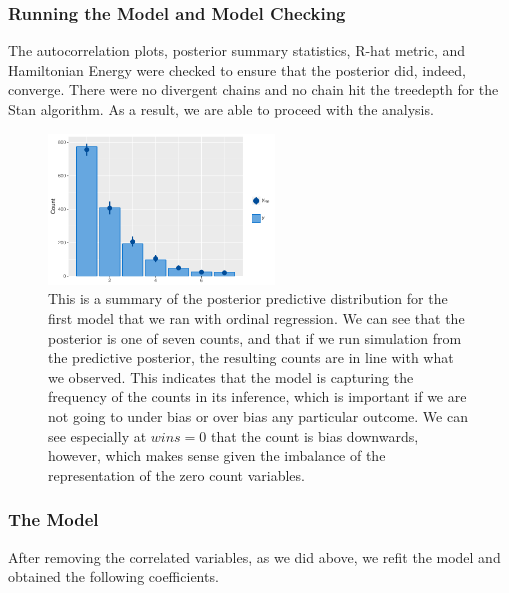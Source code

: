 \documentclass[10pt,a4paper, hidelinks]{article} %
\begin{document}
\subsubsection{Running the Model and Model Checking}

The autocorrelation plots, posterior summary statistics, R-hat metric, and Hamiltonian Energy were checked to ensure that the posterior did, indeed, converge. There were no divergent chains and no chain hit the treedepth for the Stan algorithm. As a result, we are able to proceed with the analysis.


\begin{figure}[H]
	\centering
	\includegraphics[height=4cm]{../fig/polr_nonames_pp}
	\caption{This is a summary of the posterior predictive distribution for the first model that we ran with ordinal regression. We can see that the posterior is one of seven counts, and that if we run simulation from the predictive posterior, the resulting counts are in line with what we observed. This indicates that the model is capturing the frequency of the counts in its inference, which is important if we are not going to under bias or over bias any particular outcome. We can see especially at $wins = 0$ that the count is bias downwards, however, which makes sense given the imbalance of the representation of the zero count variables.}
	\label{fig:polrnonamespp}
\end{figure}


\subsubsection{The Model}

After removing the correlated variables, as we did above, we refit the model and obtained the following coefficients.
\end{document}
